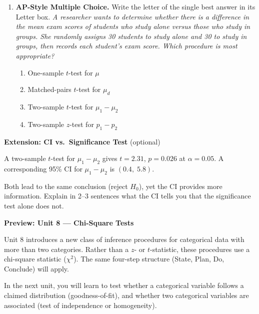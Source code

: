 \documentclass[10pt]{article}
\begin{document}
\begin{enumerate}
\vspace{0.10in}

\item \textbf{AP-Style Multiple Choice.} Write the letter of the single best answer in its Letter box. \;
      \textit{A researcher wants to determine whether there is a difference in the mean exam
      scores of students who study alone versus those who study in groups. She randomly assigns
      30 students to study alone and 30 to study in groups, then records each student's exam
      score. Which procedure is most appropriate?}

      \begin{enumerate}[label=(\Alph*)]
        \item One-sample $t$-test for $\mu$
        \item Matched-pairs $t$-test for $\mu_d$
        \item Two-sample $t$-test for $\mu_1 - \mu_2$
        \item Two-sample $z$-test for $p_1 - p_2$\rule[-0.17in]{0pt}{0.47in}
              \hfill{}
      \end{enumerate}

\end{enumerate}

\begin{extensionbox}
\textbf{Extension: CI vs.\ Significance Test} (optional)

A two-sample $t$-test for $\mu_1 - \mu_2$ gives $t = 2.31$, $p = 0.026$ at $\alpha = 0.05$.
A corresponding 95\% CI for $\mu_1 - \mu_2$ is $(0.4,\; 5.8)$.

Both lead to the same conclusion (reject $H_0$), yet the CI provides more information. Explain
in 2--3 sentences what the CI tells you that the significance test alone does not.
\end{extensionbox}

\begin{reflectionbox}
\textbf{Preview: Unit 8 --- Chi-Square Tests}

Unit 8 introduces a new class of inference procedures for categorical data with more than two
categories. Rather than a $z$- or $t$-statistic, these procedures use a chi-square statistic
($\chi^2$). The same four-step structure (State, Plan, Do, Conclude) will apply.

In the next unit, you will learn to test whether a categorical variable follows a claimed
distribution (goodness-of-fit), and whether two categorical variables are associated
(test of independence or homogeneity).
\end{reflectionbox}
\end{document}
